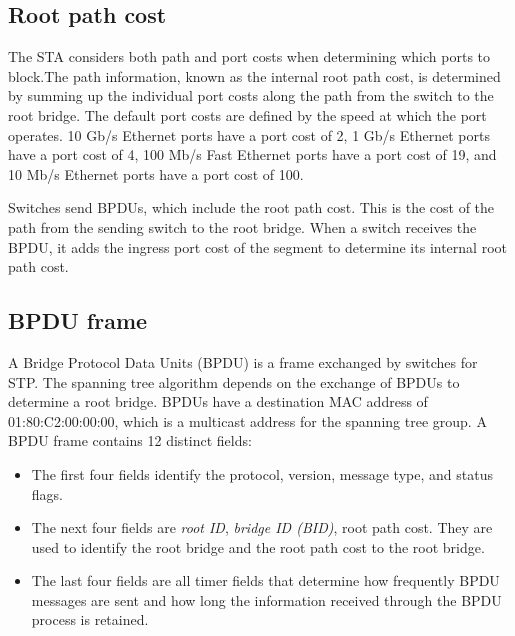 \subsection{Root path cost}
The STA considers both path and port costs when determining which ports to block.The path information, known as the internal root path cost, is determined by summing up the individual port costs along the path from the switch to the root bridge. The default port costs are defined by the speed at which the port operates. 10 Gb/s Ethernet ports have a port cost of 2, 1 Gb/s Ethernet ports have a port cost of 4, 100 Mb/s Fast Ethernet ports have a port cost of 19, and 10 Mb/s Ethernet ports have a port cost of 100.\par 
Switches send BPDUs, which include the root path cost. This is the cost of the path from the sending switch to the root bridge. When a switch receives the BPDU, it adds the ingress port cost of the segment to determine its internal root path cost.
\subsection{BPDU frame}
A Bridge Protocol Data Units (BPDU) is a frame exchanged by switches for STP. The spanning tree algorithm depends on the exchange of BPDUs to determine a root bridge. BPDUs have a destination MAC address of 01:80:C2:00:00:00, which is a multicast address for the spanning tree group.  A BPDU frame contains 12 distinct fields:
\begin{itemize}
\item The first four fields identify the protocol, version, message type, and status flags.
\item The next four fields are \textit{root ID}, \textit{bridge ID (BID)}, root path cost. They are  used to identify the root bridge and the root path cost to the root bridge.
\item The last four fields are all timer fields that determine how frequently BPDU messages are sent and how long the information received through the BPDU process is retained.
\end{itemize}
